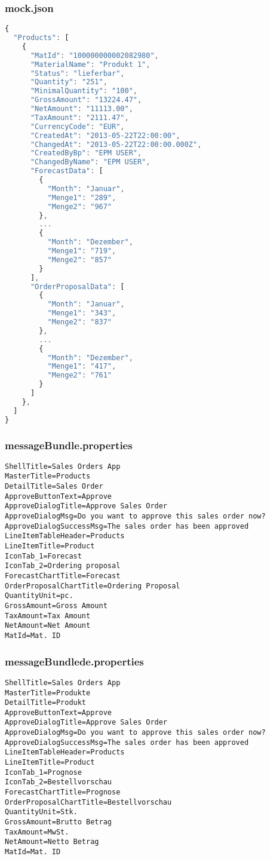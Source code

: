 \newpage
\subsubsection*{mock.json}
\begin{lstlisting}[language=JavaScript, label=lst:mock.json]
{
  "Products": [
    {
      "MatId": "100000000002082980",
      "MaterialName": "Produkt 1",
      "Status": "lieferbar",
      "Quantity": "251",
      "MinimalQuantity": "100",
      "GrossAmount": "13224.47",
      "NetAmount": "11113.00",
      "TaxAmount": "2111.47",
      "CurrencyCode": "EUR",
      "CreatedAt": "2013-05-22T22:00:00",
      "ChangedAt": "2013-05-22T22:00:00.000Z",
      "CreatedByBp": "EPM USER",
      "ChangedByName": "EPM USER",
      "ForecastData": [
        {
          "Month": "Januar",
          "Menge1": "289",
          "Menge2": "967"
        },
        ...
        {
          "Month": "Dezember",
          "Menge1": "719",
          "Menge2": "857"
        }
      ],
      "OrderProposalData": [
        {
          "Month": "Januar",
          "Menge1": "343",
          "Menge2": "837"
        },
        ...
        {
          "Month": "Dezember",
          "Menge1": "417",
          "Menge2": "761"
        }
      ]
    },
  ]
}
\end{lstlisting}

\newpage
\subsubsection*{messageBundle.properties}
\begin{lstlisting}[language=HTML5, label=lst:messageBundle.properties]
ShellTitle=Sales Orders App
MasterTitle=Products
DetailTitle=Sales Order
ApproveButtonText=Approve
ApproveDialogTitle=Approve Sales Order
ApproveDialogMsg=Do you want to approve this sales order now?
ApproveDialogSuccessMsg=The sales order has been approved
LineItemTableHeader=Products
LineItemTitle=Product
IconTab_1=Forecast
IconTab_2=Ordering proposal
ForecastChartTitle=Forecast
OrderProposalChartTitle=Ordering Proposal
QuantityUnit=pc.
GrossAmount=Gross Amount
TaxAmount=Tax Amount
NetAmount=Net Amount
MatId=Mat. ID
\end{lstlisting}

\subsubsection*{messageBundle\textunderscore de.properties}
\begin{lstlisting}[language=HTML5, label=lst:messageBundleDE.properties]
ShellTitle=Sales Orders App
MasterTitle=Produkte
DetailTitle=Produkt
ApproveButtonText=Approve
ApproveDialogTitle=Approve Sales Order
ApproveDialogMsg=Do you want to approve this sales order now?
ApproveDialogSuccessMsg=The sales order has been approved
LineItemTableHeader=Products
LineItemTitle=Product
IconTab_1=Prognose
IconTab_2=Bestellvorschau
ForecastChartTitle=Prognose
OrderProposalChartTitle=Bestellvorschau
QuantityUnit=Stk.
GrossAmount=Brutto Betrag
TaxAmount=MwSt.
NetAmount=Netto Betrag
MatId=Mat. ID

\end{lstlisting}
